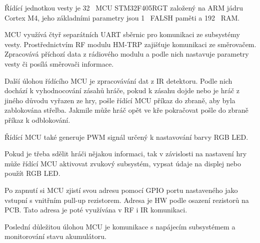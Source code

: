 Řídící jednotkou vesty je 32~ MCU STM32F405RGT založený na ARM jádru Cortex M4, jeho základními parametry jsou 1~ FALSH paměti a 192~ RAM.

MCU využívá čtyř separátních UART sběrnic pro komunikaci ze subsystémy vesty. Prostřednictvím RF modulu HM-TRP zajišťuje komunikaci ze směrovačem. Zpracovává příchozí data z rádiového modulu a podle nich nastavuje parametry vesty či posílá směrovači informace.

Další úlohou řídícího MCU je zpracovávání dat z IR detektoru. Podle nich dochází k vyhodnocování zásahů hráče, pokud k zásahu dojde nebo je hráč z jiného důvodu vyřazen ze hry, pošle řídící MCU příkaz do zbraně, aby byla zablokována střelba. Jakmile může hráč opět ve kře pokračovat pošle do zbraně příkaz k odblokování.

Řídící MCU také generuje PWM signál určený k nastavování barvy RGB LED.

Pokud je třeba sdělit hráči nějakou informaci, tak v závislosti na nastavení hry může řídící MCU aktivovat zvukový subsystém, vypsat údaje na displej nebo použít RGB LED.

Po zapnutí si MCU zjistí svou adresu pomocí GPIO portu nastaveného jako vstupní s vnitřním pull-up rezistorem. Adresa je HW podle osazení rezistorů na PCB. Tato adresa je poté využívána v RF i IR komunikaci.

Poslední důležitou úlohou MCU je komunikace s napájecím subsystémem a monitorování stavu akumulátoru.



